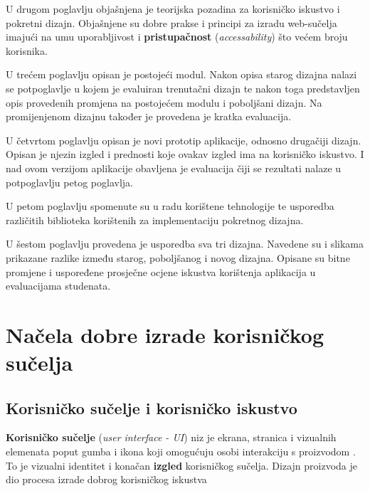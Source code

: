 \documentclass[times, utf8, zavrsni, numeric]{fer}
\begin{document}
U drugom poglavlju objašnjena je teorijska pozadina za korisničko iskustvo i pokretni dizajn. Objašnjene su dobre prakse i principi za izradu web-sučelja imajući na umu uporabljivost i \textbf{pristupačnost} (\textit{accessability}) što većem broju korisnika.


U trećem poglavlju opisan je postojeći modul. Nakon opisa starog dizajna nalazi se potpoglavlje u kojem je evaluiran trenutačni dizajn te nakon toga predstavljen opis provedenih promjena na postojećem modulu i poboljšani dizajn. Na promijenjenom dizajnu također je provedena je kratka evaluacija.


U četvrtom poglavlju opisan je novi prototip aplikacije, odnosno drugačiji dizajn. Opisan je njezin izgled i prednosti koje ovakav izgled ima na korisničko iskustvo. I nad ovom verzijom aplikacije obavljena je evaluacija čiji se rezultati nalaze u potpoglavlju petog poglavlja.

U petom poglavlju spomenute su u radu korištene tehnologije te usporedba različitih biblioteka korištenih za implementaciju pokretnog dizajna.

U šestom poglavlju provedena je usporedba sva tri dizajna. Navedene su i slikama prikazane razlike između starog, poboljšanog i novog dizajna. Opisane su bitne promjene i uspoređene prosječne ocjene iskustva korištenja aplikacija u evaluacijama studenata.



\chapter{Načela dobre izrade korisničkog sučelja}
    \section{Korisničko sučelje i korisničko iskustvo}
    \textbf{Korisničko sučelje} (\textit{user interface - UI}) niz je ekrana, stranica i vizualnih elemenata poput gumba i ikona koji omogućuju osobi interakciju s proizvodom \cite{uivsux}. To je vizualni identitet i konačan \textbf{izgled} korisničkog sučelja. Dizajn proizvoda je dio procesa izrade dobrog korisničkog iskustva
    
\end{document}
